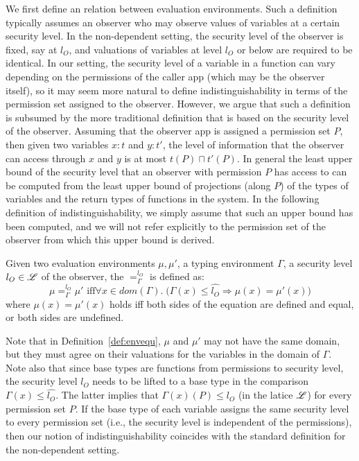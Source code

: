 {{{We first define an  relation between evaluation environments.
Such a definition typically assumes an observer who may observe values of variables at a certain security level.
In the non-dependent setting, the security level of the observer is fixed, say at $l_O$, and valuations
of variables at level $l_O$ or below are required to be identical. In our setting, the security level of
a variable in a function can vary depending on the permissions of the caller app (which may be the observer itself), so
it may seem more natural to define indistinguishability in terms of the permission set assigned to the observer. However,
we argue that such a definition is subsumed by the  
more traditional definition that is based on the security level of the observer.
Assuming that the observer app is assigned a permission set $P$, 
then given two variables $x : t$ and $y : t'$,
the level of information that the observer can access through $x$ and $y$ is at most $t(P) \sqcap t'(P).$
In general the least upper bound of the security level that an observer with permission $P$ has access to can
be computed from the least upper bound of projections (along $P$) of the types of variables and the return types
of functions in the system.
In the following definition of indistinguishability, we simply assume that
such an upper bound has been computed, and we will not refer explicitly to the permission set of the observer from
which this upper bound is derived.


\begin{definition}\label{def:envequ}
Given two evaluation environments $\mu, \mu'$,
a typing environment $\Gamma$, a security level $l_O \in \mathscr{L}$ of the observer,
the {}  $=_{\Gamma}^{l_O}$ is defined as: \begin{equation*}
\mu =_{\Gamma}^{l_{O}} \mu' \text{ iff}
\forall x\in dom(\Gamma) .\; \big(\Gamma(x) \leq \hat{l_{O}} \Rightarrow \mu(x) = \mu'(x) \big)
\end{equation*}
where
$\mu(x) = \mu'(x)$ holds iff both sides of the equation are defined and equal,
or both sides are undefined.
\end{definition}

Note that in Definition~\ref{def:envequ}, $\mu$ and $\mu'$ may not have the same domain, but they must agree on
their valuations for the variables in the domain of $\Gamma$. 
Note also that since base types are functions from permissions to security level, the security
level $l_O$ needs to be lifted to a base type in the comparison $\Gamma(x) \leq \hat{l_{O}}$.
The latter implies that
$\Gamma(x)(P) \leq l_O$ (in the latice $\mathscr{L}$) for every permission set $P.$
If the base type of each variable assigns the same security level to every permission set (i.e., the security level
is independent of the permissions), then our notion of indistinguishability coincides with the standard definition
for the non-dependent setting.



}}}
